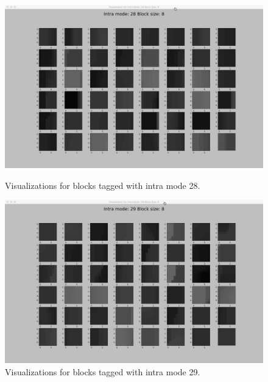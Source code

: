    \begin{figure}
    
        \vspace*{1cm} %
    
        \begin{minipage}{0.49\textwidth}
            \includegraphics[width=\linewidth]{Figures/visu-size8x8/8-28}
            \caption[Visualizations for blocks tagged with intra mode 28]{Visualizations for blocks tagged with intra mode 28.}
            \label{fig:size8_mode28}
        \end{minipage}
        \hspace{\fill} %
        \begin{minipage}{0.49\textwidth}
            \includegraphics[width=\linewidth]{Figures/visu-size8x8/8-29}
            \caption[Visualizations for blocks tagged with intra mode 29]{Visualizations for blocks tagged with intra mode 29.}
            \label{fig:size8_mode29}
        \end{minipage}
    

\end{figure}
